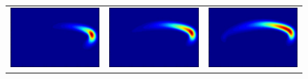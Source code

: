 \begin{figure}[H]
\begin{tabular}{ccc}
  \includegraphics[scale = 0.29]{QHO7.png}  &   \includegraphics[scale = 0.29]{QHO8.png}    &   \includegraphics[scale = 0.29]{QHO9.png} \\

\end{tabular}
\end{figure}
